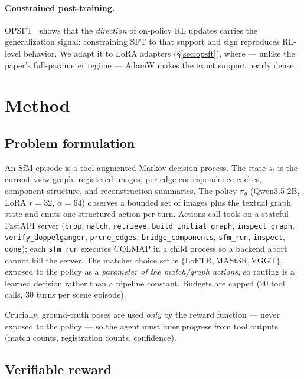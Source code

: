 \documentclass[10pt,twocolumn,letterpaper]{article}
\newcommand{\tool}[1]{\texttt{#1}}
\begin{document}
\paragraph{Constrained post-training.}
OPSFT~\cite{opsft} shows that the \emph{direction} of on-policy RL updates
carries the generalization signal: constraining SFT to that support and
sign reproduces RL-level behavior. We adapt it to LoRA adapters
(\S\ref{sec:opsft}), where — unlike the paper's full-parameter regime —
AdamW makes the exact support nearly dense.

\section{Method}
\label{sec:method}

\subsection{Problem formulation}
\label{sec:env}

An SfM episode is a tool-augmented Markov decision process. The state $s_t$
is the current view graph: registered images, per-edge correspondence
caches, component structure, and reconstruction summaries. The policy
$\pi_\theta$ (Qwen3.5-2B, LoRA $r{=}32$, $\alpha{=}64$) observes a
bounded set of images plus the textual graph state and emits one
structured action per turn. Actions call tools on a stateful FastAPI
server (\tool{crop}, \tool{match}, \tool{retrieve},
\tool{build\_initial\_graph}, \tool{inspect\_graph},
\tool{verify\_doppelganger}, \tool{prune\_edges},
\tool{bridge\_components}, \tool{sfm\_run}, \tool{inspect}, \tool{done});
each \tool{sfm\_run} executes COLMAP in a child process so a backend
abort cannot kill the server. The matcher choice set is
$\{\text{LoFTR}, \text{MASt3R}, \text{VGGT}\}$, exposed to the policy as a
\emph{parameter of the match/graph actions}, so routing is a learned
decision rather than a pipeline constant. Budgets are capped
(20 tool calls, 30 turns per scene episode).

Crucially, ground-truth poses are used \emph{only} by the reward function
— never exposed to the policy — so the agent must infer progress from
tool outputs (match counts, registration counts, confidence).

\subsection{Verifiable reward}
\label{sec:reward}
\end{document}
